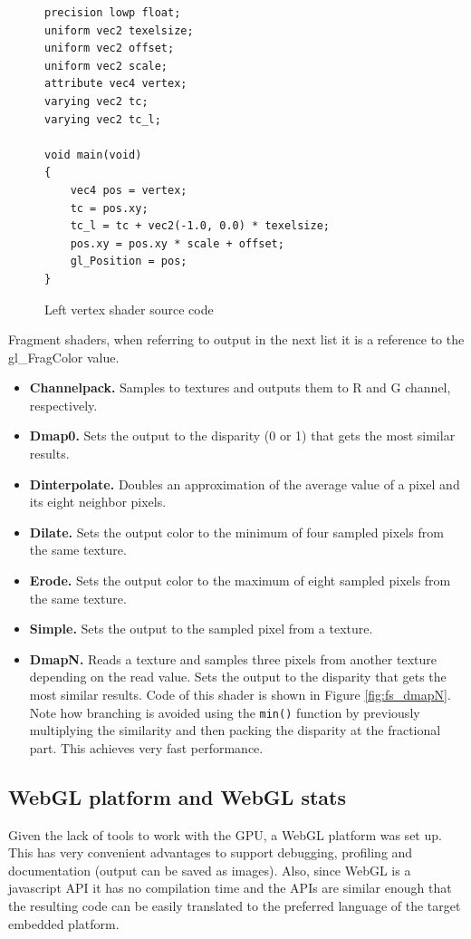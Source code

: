 \documentclass[conference]{IEEEtran}
\begin{document}
\begin{figure}[!t]
	\begin{Verbatim}[frame=single,fontsize=\scriptsize]
precision lowp float;
uniform vec2 texelsize;
uniform vec2 offset;
uniform vec2 scale;
attribute vec4 vertex;
varying vec2 tc;
varying vec2 tc_l;

void main(void) 
{
	vec4 pos = vertex;
	tc = pos.xy;
	tc_l = tc + vec2(-1.0, 0.0) * texelsize;
	pos.xy = pos.xy * scale + offset;
	gl_Position = pos;
}
	\end{Verbatim}
	\caption{Left vertex shader source code}
	\label{fig:vs_left}
\end{figure}

Fragment shaders, when referring to output in the next list it is a reference to the gl\_FragColor value.
\begin{itemize}
	\item {\bfseries Channelpack.} Samples to textures and outputs them to R and G channel, respectively.
	\item {\bfseries Dmap0.} Sets the output to the disparity (0 or 1) that gets the most similar results.
	\item {\bfseries Dinterpolate.} Doubles an approximation of the average value of a pixel and its eight neighbor pixels.
	\item {\bfseries Dilate.} Sets the output color to the  minimum of four sampled pixels from the same texture.
	\item {\bfseries Erode.} Sets the output color to the maximum of eight sampled pixels from the same texture.
	\item {\bfseries Simple.} Sets the output to the sampled pixel from a texture.
	\item {\bfseries DmapN.} Reads a texture and samples three pixels from another texture depending on the read value. Sets the output to the disparity that gets the most similar results. Code of this shader is shown in Figure \ref{fig:fs_dmapN}. Note how branching is avoided using the \texttt{min()} function by previously multiplying the similarity and then packing the disparity at the fractional part. This achieves very fast performance.
\end{itemize}

	\subsection{WebGL platform and WebGL stats}
Given the lack of tools to work with the GPU, a WebGL platform was set up. This has very convenient advantages to support debugging, profiling and documentation (output can be saved as images). Also, since WebGL is a javascript API it has no compilation time and the APIs are similar enough that the resulting code can be easily translated to the preferred language of the target embedded platform.
\end{document}

